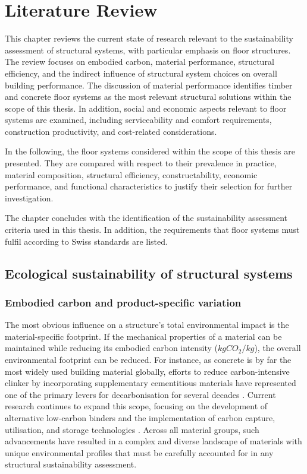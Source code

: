 
\chapter{Literature Review}\label{chap:LR} 
This chapter reviews the current state of research relevant to the sustainability assessment of structural systems, with particular emphasis on floor structures. The review focuses on embodied carbon, material performance, structural efficiency, and the indirect influence of structural system choices on overall building performance. The discussion of material performance identifies timber and concrete floor systems as the most relevant structural solutions within the scope of this thesis. In addition, social and economic aspects relevant to floor systems are examined, including serviceability and comfort requirements, construction productivity, and cost-related considerations. 

In the following, the floor systems considered within the scope of this thesis are presented. They are compared with respect to their prevalence in practice, material composition, structural efficiency, constructability, economic performance, and functional characteristics to justify their selection for further investigation. 

The chapter concludes with the identification of the sustainability assessment criteria used in this thesis. In addition, the requirements that floor systems must fulfil according to Swiss standards are listed.


\section{Ecological sustainability of structural systems \label{Sec: SustainabilityAss}}

\subsection{Embodied carbon and product-specific variation}
The most obvious influence on a structure's total environmental impact is the material-specific footprint. If the mechanical properties of a material can be maintained while reducing its embodied carbon intensity ($kgCO_2/kg$), the overall environmental footprint can be reduced.
For instance, as concrete is by far the most widely used building material globally, efforts to reduce carbon-intensive clinker by incorporating supplementary cementitious materials have represented one of the primary levers for decarbonisation for several decades \cite{artDigConc, Snellings2023}. Current research continues to expand this scope, focusing on the development of alternative low-carbon binders and the implementation of carbon capture, utilisation, and storage technologies \cite{Barbhuiya2024}. Across all material groups, such advancements have resulted in a complex and diverse landscape of materials with unique environmental profiles that must be carefully accounted for in any structural sustainability assessment.

